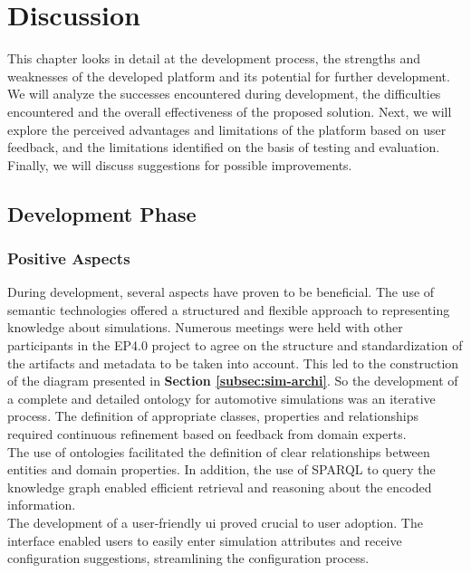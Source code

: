 \section{Discussion \label{sec:discussion}}
This chapter looks in detail at the development process, the strengths and weaknesses of the developed platform and its potential for further development. We will analyze the successes encountered during development, the difficulties encountered and the overall effectiveness of the proposed solution.  Next, we will explore the perceived advantages and limitations of the platform based on user feedback, and the limitations identified on the basis of testing and evaluation. Finally, we will discuss suggestions for possible improvements.

\subsection{Development Phase}
    \subsubsection{Positive Aspects}
    During development, several aspects have proven to be beneficial. The use of semantic technologies offered a structured and flexible approach to representing knowledge about simulations. Numerous meetings were held with other participants in the EP4.0 project to agree on the structure and standardization of the artifacts and metadata to be taken into account. This led to the construction of the diagram presented in \textbf{Section \ref{subsec:sim-archi}}. So the development of a complete and detailed ontology for automotive simulations was an iterative process. The definition of appropriate classes, properties and relationships required continuous refinement based on feedback from domain experts.\\
    
    The use of ontologies facilitated the definition of clear relationships between entities and domain properties. In addition, the use of SPARQL to query the knowledge graph enabled efficient retrieval and reasoning about the encoded information.\\

    The development of a user-friendly \acrshort{ui} proved crucial to user adoption. The interface enabled users to easily enter simulation attributes and receive configuration suggestions, streamlining the configuration process.\\

